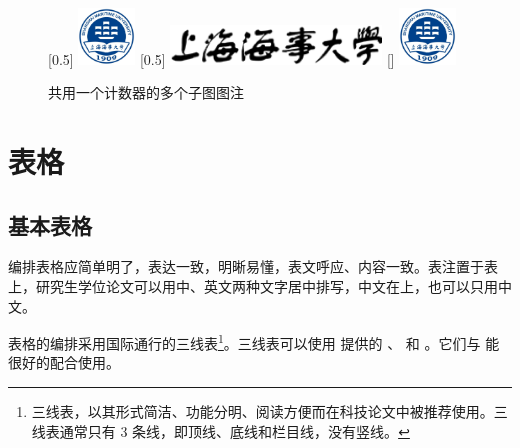\begin{figure}[!htp]
	[0.5\textwidth]{%
	  \includegraphics[height=1.5cm]{images/shmtu-badge}
	}
  \hfill
    [0.5\textwidth]{%
	  \includegraphics[width=0.5\textwidth]{images/shmtu-name}
	}
  \hfill
    [\textwidth]{%
	  \includegraphics[height=1.5cm]{images/shmtu-badge}
  }
  \caption{共用一个计数器的多个子图图注}
  \label{fig:subcaptionbox}
\end{figure}

\section{表格}

\subsection{基本表格}

编排表格应简单明了，表达一致，明晰易懂，表文呼应、内容一致。表注置于表上，研究生学位论文可以用中、英文两种文字居中排写，中文在上，也可以只用中文。

表格的编排采用国际通行的三线表\footnote{三线表，以其形式简洁、功能分明、阅读方便而在科技论文中被推荐使用。三线表通常只有 3 条线，即顶线、底线和栏目线，没有竖线。}。三线表可以使用  提供的 、 和 。它们与  能很好的配合使用。

